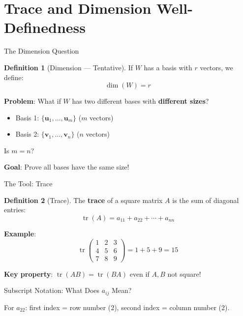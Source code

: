 \documentclass[10pt]{beamer}
\theoremstyle{definition}
\newtheorem{defi}{Definition}[section]
\newcommand{\x}[1]{\alert{\textbf{#1}}}
\begin{document}
\section{Trace and Dimension Well-Definedness}

\begin{frame}{The Dimension Question}
\begin{defi}[Dimension — Tentative]
If $W$ has a basis with $r$ vectors, we define:
$$\dim(W) = r$$
\end{defi}

\vfill
\x{Problem}: What if $W$ has two different bases with \x{different sizes}?

\begin{itemize}
\item Basis 1: $\{\mathbf{u}_1, \ldots, \mathbf{u}_m\}$ ($m$ vectors)
\item Basis 2: $\{\mathbf{v}_1, \ldots, \mathbf{v}_n\}$ ($n$ vectors)
\end{itemize}

Is $m = n$?

\vfill
\x{Goal}: Prove all bases have the same size!
\end{frame}

\begin{frame}{The Tool: Trace}
\begin{defi}[Trace]
The \x{trace} of a square matrix $A$ is the sum of diagonal entries:
$$\operatorname{tr}(A) = a_{11} + a_{22} + \cdots + a_{nn}$$
\end{defi}

\vfill
\x{Example}:
$$\operatorname{tr}\begin{pmatrix} 1 & 2 & 3 \\ 4 & 5 & 6 \\ 7 & 8 & 9 \end{pmatrix} = 1 + 5 + 9 = 15$$

\vfill
\x{Key property}: $\operatorname{tr}(AB) = \operatorname{tr}(BA)$ even if $A, B$ not square!
\end{frame}

\begin{frame}[fragile]{Subscript Notation: What Does $a_{ij}$ Mean?}
\begin{center}
\end{center}

\vfill
For $a_{22}$: first index = row number (2), second index = column number (2).
\end{frame}
\end{document}
